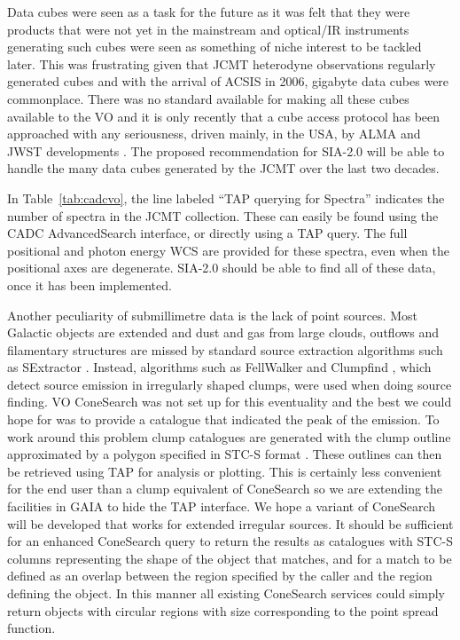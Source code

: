 \documentclass[final,authoryear,5p,times,twocolumn]{elsarticle}
\begin{document}
Data cubes were seen as a task for the future as it was
felt that they were products that were not yet in the mainstream and
optical/IR instruments generating such cubes \citep[such as
the UIST IFU or TAURUS imaging Fabry-Perot spectrometer;][]{2004SPIE.5492.1160R,1982MNRAS.201..661A}
were seen as something of niche interest to be tackled later.
This was frustrating given that JCMT heterodyne
observations regularly generated cubes and with the arrival of ACSIS
in 2006, gigabyte data cubes were commonplace. There was no standard
available for making all these cubes available to the VO and it is
only recently \citep[e.g.,][]{2014AAS...22325505T} that a cube access
protocol has been approached with any seriousness, driven mainly, in
the USA, by ALMA and JWST developments \citep[e.g.,
MIRI;][]{2010SPIE.7731E..10W}. The proposed
recommendation for SIA-2.0 \citep{siav2}
will be able to handle the many data cubes generated by the JCMT
over the last two decades.

In Table~\ref{tab:cadcvo}, the line labeled ``TAP querying for Spectra''
indicates the number of spectra in the JCMT collection.  These can
easily be found using the CADC AdvancedSearch interface, or directly using
a TAP query.  The full positional and photon energy WCS are provided
for these spectra, even when the positional axes are degenerate.   SIA-2.0
should be able to find all of these data, once it has been implemented.

Another peculiarity of submillimetre data is the lack of point
sources. Most Galactic objects are extended and dust and gas from
large clouds, outflows and filamentary structures are missed by
standard source extraction algorithms such as SExtractor
\citep[][]{1996A&AS..117..393B}. Instead, algorithms
such as FellWalker \citep[][]{2015FW,2007ASPC..376..425B} and
Clumpfind \citep[][]{1994ApJ...428..693W}, which detect
source emission in irregularly shaped clumps, were used when
doing source finding. VO ConeSearch was not
set up for this eventuality and the best we could hope for was to
provide a catalogue that indicated the peak of the emission. To work
around this problem clump catalogues are generated with the clump
outline approximated by a polygon specified in STC-S format
\citep{2010ASPC..434..213B}. These outlines can then be retrieved
using TAP for analysis or plotting. This is certainly less convenient
for the end user than a clump equivalent of ConeSearch so we are
extending the facilities in GAIA
\citep[][]{2009ASPC..411..575D} to hide the TAP
interface. We hope a variant of ConeSearch will be developed that
works for extended irregular sources.
It should be sufficient for an enhanced ConeSearch query to return
the results as catalogues with STC-S columns representing the shape of
the object that matches, and for a match to be defined as an overlap
between the region specified by the caller and the region defining the
object. In this manner all existing ConeSearch services could simply
return objects with circular regions with size corresponding to the
point spread function.
\end{document}

